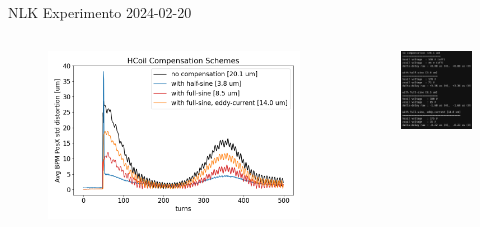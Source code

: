 \documentclass{beamer}					  %
\begin{document}
\begin{frame}{NLK}
    \vspace{0.2 cm}
    Experimento 2024-02-20
    \begin{columns}
        \begin{column}{0.75\textwidth}
            \begin{figure}[H]
                \centering
                \includegraphics[width=1\textwidth]{2024-04-19/figures/hcoil-compensation-scheme.png}
                \label{fig:hcoil-distortion}
            \end{figure}
        \end{column}
        \begin{column}{0.4\textwidth}
            \begin{figure}[H]
                \centering
                \includegraphics[width=1.0\textwidth]{2024-04-19/figures/hcoil-table.png} \hspace*{4cm}

\end{figure}
\end{column}
\end{columns}
\end{frame}
\end{document}
